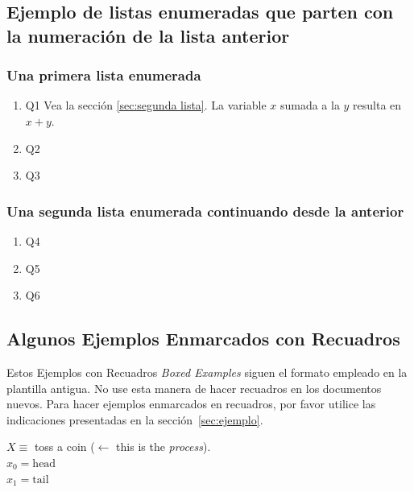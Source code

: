 \documentclass[11pt,letterpaper,twoside]{report}%
\begin{document}
\subsection{Ejemplo de listas enumeradas que parten con la numeración de la lista anterior}

\subsubsection{Una primera lista enumerada}\label{sec:primera_lista}
\setcounter{total}{0}
\begin{enumerate}
\setcounter{enumi}{\value{total}}
\item Q1 Vea la sección \ref{sec:segunda lista}. La variable $x$ sumada a la $y$ resulta en $x+y$.
\item Q2
\item Q3

\setcounter{total}{\value{enumi}}
\end{enumerate}

\subsubsection{Una segunda lista enumerada continuando desde la anterior}\label{sec:segunda_lista}
\begin{enumerate}
\setcounter{enumi}{\value{total}}
\item Q4
\item Q5
\item Q6

\setcounter{total}{\value{enumi}}
\end{enumerate}

\subsection{Algunos Ejemplos Enmarcados con Recuadros}
Estos Ejemplos con  Recuadros {\em Boxed Examples} siguen el formato empleado en la plantilla antigua.  No use esta manera de hacer recuadros en los documentos nuevos.  Para hacer ejemplos enmarcados en recuadros, por favor utilice las indicaciones presentadas en la sección~\ref{sec:ejemplo}.

\begin{example}
$X \equiv$ toss a coin ($\leftarrow$ this is the {\em process}).\\[1ex]
$x_0 = \textrm{head}$\\[1ex]
$x_1 = \textrm{tail}$\\[1ex]
\end{example}
\end{document}
